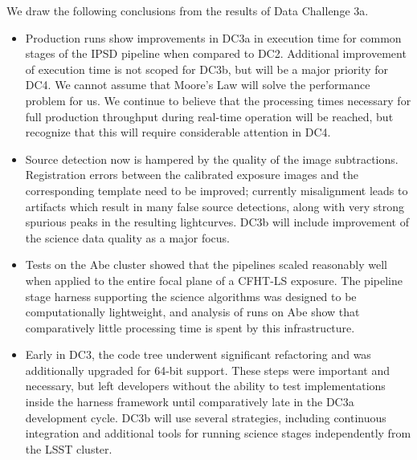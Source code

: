 We draw the following conclusions from the results of Data Challenge 3a.

\begin{itemize}
\item Production runs show improvements in DC3a in execution time for common
stages of the IPSD pipeline when compared to DC2. Additional improvement of
execution time is not scoped for DC3b, but will be a major priority for DC4. We
cannot assume that Moore's Law will solve the performance problem for us. We
continue to believe that the processing times necessary for full production
throughput during real-time operation will be reached, but recognize that this
will require considerable attention in DC4.

\item Source detection now is hampered by the quality of the image subtractions.
Registration errors between the calibrated exposure images and the corresponding
template need to be improved; currently misalignment leads to artifacts which
result in many false source detections, along with very strong spurious peaks in
the resulting lightcurves. DC3b will include improvement of the science data
quality as a major focus.

\item Tests on the Abe cluster showed that the pipelines scaled reasonably 
well when applied to the entire focal plane of a CFHT-LS exposure. The 
pipeline stage harness supporting the science algorithms was designed to
be computationally lightweight, and analysis of runs on Abe show that 
comparatively little processing time is spent by this infrastructure.

\item Early in DC3, the code tree underwent significant refactoring and was
additionally upgraded for 64-bit support. These steps were important and
necessary, but left developers without the ability to test implementations
inside the harness framework until comparatively late in the DC3a development
cycle. DC3b will use several strategies, including continuous integration
and additional tools for running science stages independently from the 
LSST cluster.

\end{itemize}
